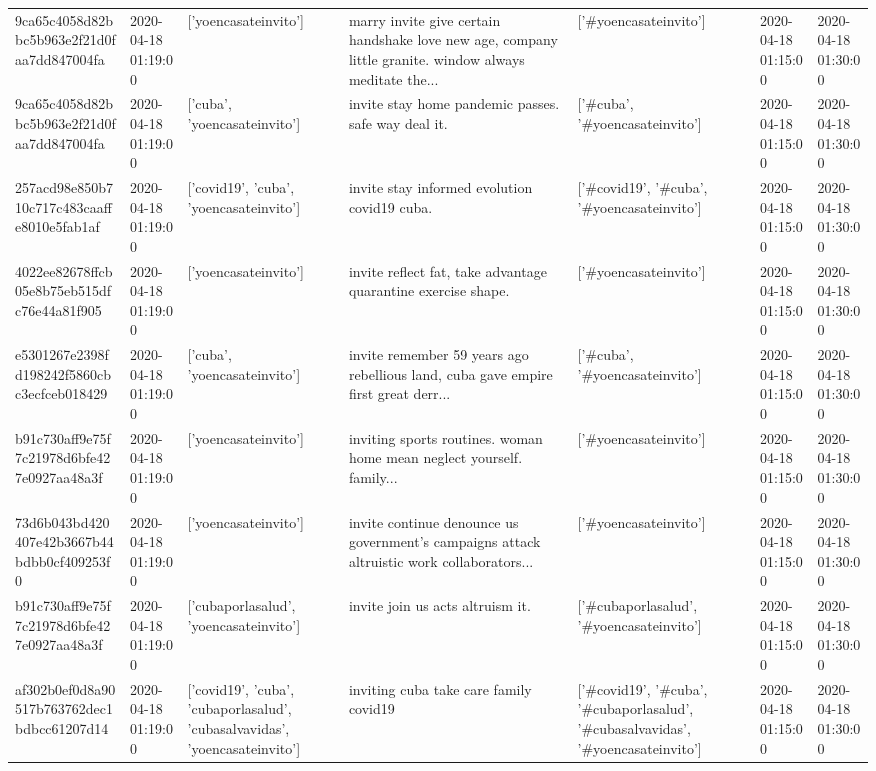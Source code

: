 \begin{tabular}{lllllll}
9ca65c4058d82bbc5b963e2f21d0faa7dd847004fa & 2020-04-18 01:19:00 & ['yoencasateinvito'] & marry invite give certain handshake love new age, company little granite. window always meditate the... & ['#yoencasateinvito'] & 2020-04-18 01:15:00 & 2020-04-18 01:30:00 \\
9ca65c4058d82bbc5b963e2f21d0faa7dd847004fa & 2020-04-18 01:19:00 & ['cuba', 'yoencasateinvito'] & invite stay home pandemic passes. safe way deal it. & ['#cuba', '#yoencasateinvito'] & 2020-04-18 01:15:00 & 2020-04-18 01:30:00 \\
257acd98e850b710c717c483caaffe8010e5fab1af & 2020-04-18 01:19:00 & ['covid19', 'cuba', 'yoencasateinvito'] & invite stay informed evolution covid19 cuba. & ['#covid19', '#cuba', '#yoencasateinvito'] & 2020-04-18 01:15:00 & 2020-04-18 01:30:00 \\
4022ee82678ffcb05e8b75eb515dfc76e44a81f905 & 2020-04-18 01:19:00 & ['yoencasateinvito'] & invite reflect fat, take advantage quarantine exercise shape. & ['#yoencasateinvito'] & 2020-04-18 01:15:00 & 2020-04-18 01:30:00 \\
e5301267e2398fd198242f5860cbc3ecfceb018429 & 2020-04-18 01:19:00 & ['cuba', 'yoencasateinvito'] & invite remember 59 years ago rebellious land, cuba gave empire first great derr... & ['#cuba', '#yoencasateinvito'] & 2020-04-18 01:15:00 & 2020-04-18 01:30:00 \\
b91c730aff9e75f7c21978d6bfe427e0927aa48a3f & 2020-04-18 01:19:00 & ['yoencasateinvito'] & inviting sports routines. woman home mean neglect yourself. family... & ['#yoencasateinvito'] & 2020-04-18 01:15:00 & 2020-04-18 01:30:00 \\
73d6b043bd420407e42b3667b44bdbb0cf409253f0 & 2020-04-18 01:19:00 & ['yoencasateinvito'] & invite continue denounce us government's campaigns attack altruistic work collaborators... & ['#yoencasateinvito'] & 2020-04-18 01:15:00 & 2020-04-18 01:30:00 \\
b91c730aff9e75f7c21978d6bfe427e0927aa48a3f & 2020-04-18 01:19:00 & ['cubaporlasalud', 'yoencasateinvito'] & invite join us acts altruism it. & ['#cubaporlasalud', '#yoencasateinvito'] & 2020-04-18 01:15:00 & 2020-04-18 01:30:00 \\
af302b0ef0d8a90517b763762dec1bdbcc61207d14 & 2020-04-18 01:19:00 & ['covid19', 'cuba', 'cubaporlasalud', 'cubasalvavidas', 'yoencasateinvito'] & inviting cuba take care family covid19 & ['#covid19', '#cuba', '#cubaporlasalud', '#cubasalvavidas', '#yoencasateinvito'] & 2020-04-18 01:15:00 & 2020-04-18 01:30:00 \\

\end{tabular}
